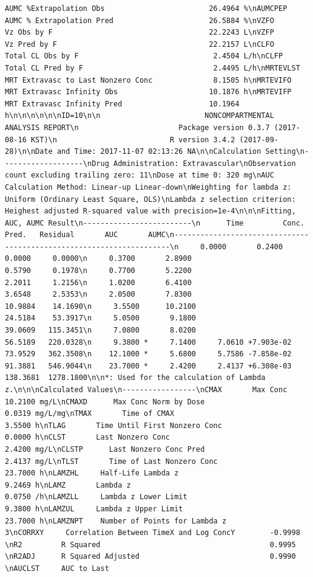 \documentclass[12pt,]{krantz}
\theoremstyle{definition}
\theoremstyle{definition}
\theoremstyle{definition}
\theoremstyle{remark}
\begin{document}
\begin{verbatim}
AUMC %Extrapolation Obs                        26.4964 %\nAUMCPEP    AUMC % Extrapolation Pred                      26.5884 %\nVZFO       Vz Obs by F                                    22.2243 L\nVZFP       Vz Pred by F                                   22.2157 L\nCLFO       Total CL Obs by F                               2.4504 L/h\nCLFP       Total CL Pred by F                              2.4495 L/h\nMRTEVLST   MRT Extravasc to Last Nonzero Conc              8.1505 h\nMRTEVIFO   MRT Extravasc Infinity Obs                     10.1876 h\nMRTEVIFP   MRT Extravasc Infinity Pred                    10.1964 h\n\n\n\n\n\nID=10\n\n                        NONCOMPARTMENTAL ANALYSIS REPORT\n                       Package version 0.3.7 (2017-08-16 KST)\n                          R version 3.4.2 (2017-09-28)\n\nDate and Time: 2017-11-07 02:13:26 NA\n\nCalculation Setting\n-------------------\nDrug Administration: Extravascular\nObservation count excluding trailing zero: 11\nDose at time 0: 320 mg\nAUC Calculation Method: Linear-up Linear-down\nWeighting for lambda z: Uniform (Ordinary Least Square, OLS)\nLambda z selection criterion: Heighest adjusted R-squared value with precision=1e-4\n\n\nFitting, AUC, AUMC Result\n-------------------------\n      Time         Conc.      Pred.   Residual       AUC       AUMC\n---------------------------------------------------------------------\n     0.0000       0.2400                           0.0000     0.0000\n     0.3700       2.8900                           0.5790     0.1978\n     0.7700       5.2200                           2.2011     1.2156\n     1.0200       6.4100                           3.6548     2.5353\n     2.0500       7.8300                          10.9884    14.1690\n     3.5500      10.2100                          24.5184    53.3917\n     5.0500       9.1800                          39.0609   115.3451\n     7.0800       8.0200                          56.5189   220.0328\n     9.3800 *     7.1400     7.0610 +7.903e-02    73.9529   362.3508\n    12.1000 *     5.6800     5.7586 -7.858e-02    91.3881   546.9044\n    23.7000 *     2.4200     2.4137 +6.308e-03   138.3681  1278.1800\n\n*: Used for the calculation of Lambda z.\n\n\nCalculated Values\n-----------------\nCMAX       Max Conc                                       10.2100 mg/L\nCMAXD      Max Conc Norm by Dose                           0.0319 mg/L/mg\nTMAX       Time of CMAX                                    3.5500 h\nTLAG       Time Until First Nonzero Conc                   0.0000 h\nCLST       Last Nonzero Conc                               2.4200 mg/L\nCLSTP      Last Nonzero Conc Pred                          2.4137 mg/L\nTLST       Time of Last Nonzero Conc                      23.7000 h\nLAMZHL     Half-Life Lambda z                              9.2469 h\nLAMZ       Lambda z                                        0.0750 /h\nLAMZLL     Lambda z Lower Limit                            9.3800 h\nLAMZUL     Lambda z Upper Limit                           23.7000 h\nLAMZNPT    Number of Points for Lambda z                   3\nCORRXY     Correlation Between TimeX and Log ConcY        -0.9998 \nR2         R Squared                                       0.9995 \nR2ADJ      R Squared Adjusted                              0.9990 \nAUCLST     AUC to Last 
\end{verbatim}
\end{document}
